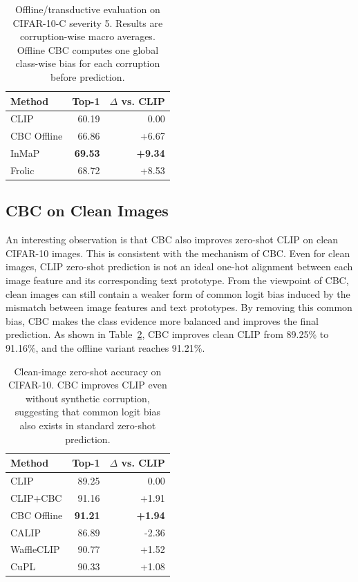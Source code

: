 \begin{table}[t]
\centering
\caption{Offline/transductive evaluation on CIFAR-10-C severity 5. Results are corruption-wise macro averages. Offline CBC computes one global class-wise bias for each corruption before prediction.}
\label{tab:offline}
\small
\begin{tabular}{lrr}
\toprule
\textbf{Method} & \textbf{Top-1} & \textbf{$\Delta$ vs. CLIP} \\
\midrule
CLIP & 60.19 & 0.00 \\
CBC Offline & 66.86 & +6.67 \\
InMaP & \textbf{69.53} & \textbf{+9.34} \\
Frolic & 68.72 & +8.53 \\
\bottomrule
\end{tabular}
\end{table}

\subsection{CBC on Clean Images}
\label{subsec:clean}

An interesting observation is that CBC also improves zero-shot CLIP on clean CIFAR-10 images.
This is consistent with the mechanism of CBC.
Even for clean images, CLIP zero-shot prediction is not an ideal one-hot alignment between each image feature and its corresponding text prototype.
From the viewpoint of CBC, clean images can still contain a weaker form of common logit bias induced by the mismatch between image features and text prototypes.
By removing this common bias, CBC makes the class evidence more balanced and improves the final prediction.
As shown in Table~\ref{tab:clean}, CBC improves clean CLIP from 89.25\% to 91.16\%, and the offline variant reaches 91.21\%.

\begin{table}[t]
\centering
\caption{Clean-image zero-shot accuracy on CIFAR-10. CBC improves CLIP even without synthetic corruption, suggesting that common logit bias also exists in standard zero-shot prediction.}
\label{tab:clean}
\small
\begin{tabular}{lrr}
\toprule
\textbf{Method} & \textbf{Top-1} & \textbf{$\Delta$ vs. CLIP} \\
\midrule
CLIP & 89.25 & 0.00 \\
CLIP+CBC & 91.16 & +1.91 \\
CBC Offline & \textbf{91.21} & \textbf{+1.94} \\
CALIP & 86.89 & -2.36 \\
WaffleCLIP & 90.77 & +1.52 \\
CuPL & 90.33 & +1.08 \\
\bottomrule
\end{tabular}
\end{table}

